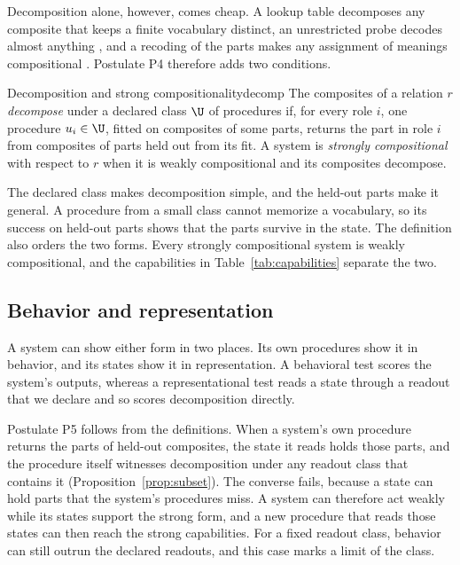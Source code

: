 Decomposition alone, however, comes cheap. A lookup table decomposes any composite that keeps a finite vocabulary distinct, an unrestricted probe decodes almost anything \citep{hewitt2019}, and a recoding of the parts makes any assignment of meanings compositional \citep{zadrozny1994}. Postulate P4 therefore adds two conditions.

\begin{defbox}{Decomposition and strong compositionality}{decomp}
The composites of a relation $r$ \emph{decompose} under a declared class $\U$ of procedures if, for every role $i$, one procedure $u_i \in \U$, fitted on composites of some parts, returns the part in role $i$ from composites of parts held out from its fit. A system is \emph{strongly compositional} with respect to $r$ when it is weakly compositional and its composites decompose.
\end{defbox}

The declared class makes decomposition simple, and the held-out parts make it general. A procedure from a small class cannot memorize a vocabulary, so its success on held-out parts shows that the parts survive in the state. The definition also orders the two forms. Every strongly compositional system is weakly compositional, and the capabilities in Table~\ref{tab:capabilities} separate the two.

\subsection{Behavior and representation}
\label{sec:subset}

A system can show either form in two places. Its own procedures show it in behavior, and its states show it in representation. A behavioral test scores the system's outputs, whereas a representational test reads a state through a readout that we declare and so scores decomposition directly.

Postulate P5 follows from the definitions. When a system's own procedure returns the parts of held-out composites, the state it reads holds those parts, and the procedure itself witnesses decomposition under any readout class that contains it (Proposition~\ref{prop:subset}). The converse fails, because a state can hold parts that the system's procedures miss. A system can therefore act weakly while its states support the strong form, and a new procedure that reads those states can then reach the strong capabilities. For a fixed readout class, behavior can still outrun the declared readouts, and this case marks a limit of the class.

